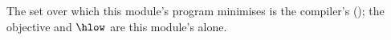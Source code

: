 
The set over which this module's program minimises is the compiler's
 (); the objective and
$\hlow$ are this module's alone.

